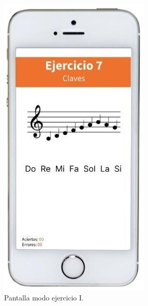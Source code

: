 \documentclass[spanish]{textolivre}
\begin{document}

\noindent
\begin{minipage}[b]{0.30\textwidth}
    \begin{figure}[H]
        \centering
        \includegraphics[width=\linewidth]{Fig5.jpg}
        \caption{Pantalla modo ejercicio I.}
    \end{figure}
\end{minipage}
\end{document}
